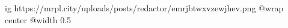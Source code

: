  
 
 
 
 

\ifcmt
  ig https://mrpl.city/uploads/posts/redactor/emrjbtwxvzewjhev.png
  @wrap center
  @width 0.5
\fi
